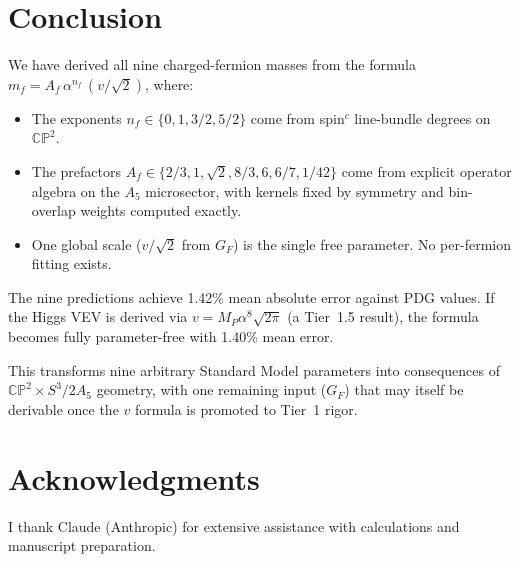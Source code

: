 \documentclass[11pt,a4paper]{article}
\newcommand{\CP}{\mathbb{CP}}
\theoremstyle{remark}
\begin{document}
\section{Conclusion}
\label{sec:conclusion}

We have derived all nine charged-fermion masses from the formula
$m_f = A_f\,\alpha^{n_f}\,(v/\sqrt{2})$, where:
\begin{itemize}
\item The exponents $n_f \in \{0, 1, 3/2, 5/2\}$ come from spin$^c$
  line-bundle degrees on $\CP^2$.
\item The prefactors $A_f \in \{2/3, 1, \sqrt{2}, 8/3, 6, 6/7, 1/42\}$
  come from explicit operator algebra on the $A_5$ microsector, with
  kernels fixed by symmetry and bin-overlap weights computed exactly.
\item One global scale ($v/\sqrt{2}$ from $G_F$) is the single free parameter.
  No per-fermion fitting exists.
\end{itemize}

The nine predictions achieve 1.42\% mean absolute error against PDG values.
If the Higgs VEV is derived via $v = M_P\alpha^8\sqrt{2\pi}$ (a Tier~1.5
result), the formula becomes fully parameter-free with 1.40\% mean error.

This transforms nine arbitrary Standard Model parameters into consequences
of $\CP^2 \times S^3/2A_5$ geometry, with one remaining input ($G_F$)
that may itself be derivable once the $v$ formula is promoted to Tier~1 rigor.


\section*{Acknowledgments}

I thank Claude (Anthropic) for extensive assistance with calculations and
manuscript preparation.
\end{document}
